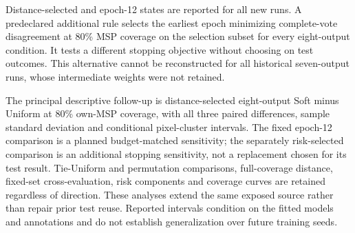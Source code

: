 Distance-selected and epoch-12 states are reported for all new runs. A predeclared additional rule selects the earliest epoch minimizing complete-vote disagreement at 80\% MSP coverage on the selection subset for every eight-output condition. It tests a different stopping objective without choosing on test outcomes. This alternative cannot be reconstructed for all historical seven-output runs, whose intermediate weights were not retained.

The principal descriptive follow-up is distance-selected eight-output Soft minus Uniform at 80\% own-MSP coverage, with all three paired differences, sample standard deviation and conditional pixel-cluster intervals. The fixed epoch-12 comparison is a planned budget-matched sensitivity; the separately risk-selected comparison is an additional stopping sensitivity, not a replacement chosen for its test result. Tie-Uniform and permutation comparisons, full-coverage distance, fixed-set cross-evaluation, risk components and coverage curves are retained regardless of direction. These analyses extend the same exposed source rather than repair prior test reuse. Reported intervals condition on the fitted models and annotations and do not establish generalization over future training seeds.

